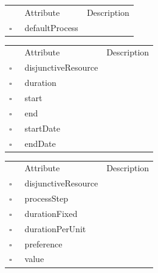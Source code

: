 \clearpage
\begin{table}
\caption{Product  }

\begin{longtable}{llp{8cm}}
& Attribute & Description \\
$\square$\ & defaultProcess &  \\
\end{longtable}
\label{attr:Product}
\end{table}

\begin{table}
\caption{ResourceActivity  }

\begin{longtable}{llp{8cm}}
& Attribute & Description \\
$\square$\ & disjunctiveResource &  \\
$\square$\ & duration &  \\
$\square$\ & start &  \\
$\square$\ & end &  \\
$\square$\ & startDate &  \\
$\square$\ & endDate &  \\
\end{longtable}
\label{attr:ResourceActivity}
\end{table}

\begin{table}
\caption{ResourceNeed  }

\begin{longtable}{llp{8cm}}
& Attribute & Description \\
$\square$\ & disjunctiveResource &  \\
$\square$\ & processStep &  \\
$\square$\ & durationFixed &  \\
$\square$\ & durationPerUnit &  \\
$\square$\ & preference &  \\
$\square$\ & value &  \\
\end{longtable}
\label{attr:ResourceNeed}
\end{table}

